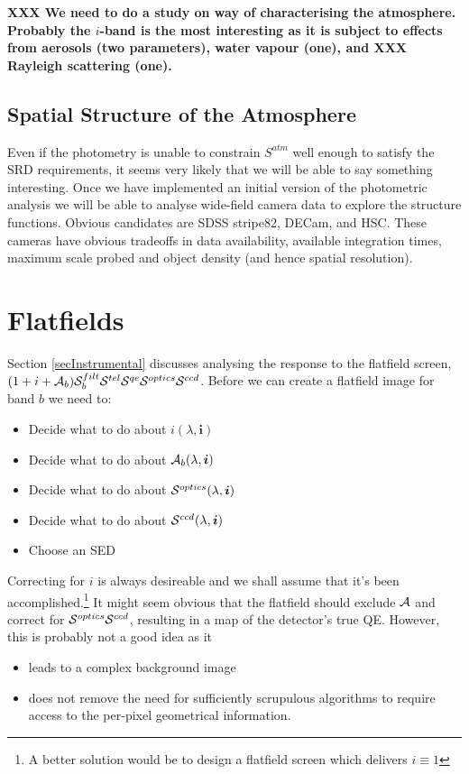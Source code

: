 \documentclass[12pt]{article}
\newcommand{\ib}{{\boldsymbol i}}
\newcommand{\additive}{{\cal A}}
\newcommand{\qe}{{\cal S}}
\newcommand{\XXX}[1]{\textbf{XXX #1}\xspace}
\begin{document}
\XXX{We need to do a study on way of characterising the atmosphere. Probably the $i$-band is the most
interesting as it is subject to effects from aerosols (two parameters), water vapour (one), and \XXX{Rayleigh scattering} (one).}

\subsection{Spatial Structure of the Atmosphere}

Even if the photometry is unable to constrain $S^{atm}$ well enough to satisfy the SRD requirements, it seems
very likely that we will be able to say something interesting.  Once we have implemented an initial version of
the photometric analysis we will be able to analyse wide-field camera data to explore the structure functions.
Obvious candidates are SDSS stripe82, DECam, and HSC.  These cameras have obvious tradeoffs in data
availability, available integration times, maximum scale probed and object density (and hence spatial
resolution).

\section{Flatfields}
\label{secFlatFielding}

Section \ref{secInstrumental} discusses analysing the response to the flatfield screen,
$(1 + i + \additive_b) \qe_b^{filt} \qe^{tel} \qe^{qe} \qe^{optics} \qe^{ccd}$.
Before we can create a flatfield image for band $b$ we need to:
\begin{itemize}
\item Decide what to do about $i(\lambda, \ib)$
\item Decide what to do about $\additive_b(\lambda, \ib)$
\item Decide what to do about $\qe^{optics}(\lambda, \ib)$
\item Decide what to do about $\qe^{ccd}(\lambda, \ib)$
\item Choose an SED
\end{itemize}

Correcting for $i$ is always desireable and we shall assume that it's been accomplished.\footnote{A better
  solution would be to design a flatfield screen which delivers $i \equiv 1$} It might seem obvious that the
flatfield should exclude $\additive$ and correct for $\qe^{optics} \qe^{ccd}$, resulting in a map of the
detector's true QE.  However, this is probably not a good idea as it
\begin{itemize}
\item leads to a complex background image
\item does not remove the need for sufficiently scrupulous algorithms to require access to the per-pixel
  geometrical information.
\end{itemize}
\end{document}
